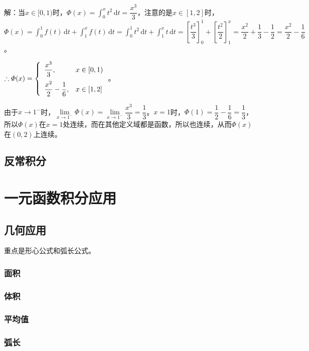 \documentclass[UTF8, 12pt]{ctexart}
\begin{document}
解：当$x\in[0,1)$时，$\varPhi(x)=\int_0^xt^2\,\textrm{d}t=\dfrac{x^3}{3}$，注意的是$x\in[1,2]$时，$\varPhi(x)=\int_0^1f(t)\,\textrm{d}t+\int_1^xf(t)\,\textrm{d}t=\int_0^1t^2\,\textrm{d}t+\int_1^xt\,\textrm{d}t=\left[\dfrac{t^3}{3}\right]_0^1+\left[\dfrac{t^2}{2}\right]_1^x=\dfrac{x^2}{2}+\dfrac{1}{3}-\dfrac{1}{2}=\dfrac{x^2}{2}-\dfrac{1}{6}$。

$\therefore\varPhi(x)=\left\{\begin{array}{ll}
    \dfrac{x^3}{3}, & x\in[0,1) \medskip \\
    \dfrac{x^2}{2}-\dfrac{1}{6}, & x\in[1,2]
\end{array}\right.$。

由于$x\to1^-$时，$\lim\limits_{x\to1^-}\varPhi(x)=\lim\limits_{x\to1^-}\dfrac{x^3}{3}=\dfrac{1}{3}$。$x=1$时，$\varPhi(1)=\dfrac{1}{2}-\dfrac{1}{6}=\dfrac{1}{3}$，所以$\varPhi(x)$在$x=1$处连续，而在其他定义域都是函数，所以也连续，从而$\varPhi(x)$在$(0,2)$上连续。

\subsection{反常积分}

\section{一元函数积分应用}

\subsection{几何应用}

重点是形心公式和弧长公式。

\subsubsection{面积}

\subsubsection{体积}

\subsubsection{平均值}

\subsubsection{弧长}
\end{document}
